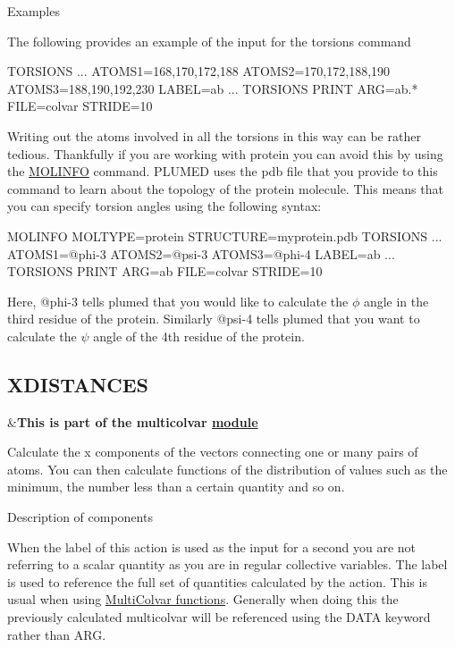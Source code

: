 \begin{DoxyParagraph}{Examples}

\end{DoxyParagraph}
The following provides an example of the input for the torsions command

\begin{DoxyVerb}TORSIONS ...
ATOMS1=168,170,172,188
ATOMS2=170,172,188,190
ATOMS3=188,190,192,230 
LABEL=ab
... TORSIONS
PRINT ARG=ab.* FILE=colvar STRIDE=10
\end{DoxyVerb}


Writing out the atoms involved in all the torsions in this way can be rather tedious. Thankfully if you are working with protein you can avoid this by using the \hyperlink{MOLINFO}{M\+O\+L\+I\+N\+F\+O} command. P\+L\+U\+M\+E\+D uses the pdb file that you provide to this command to learn about the topology of the protein molecule. This means that you can specify torsion angles using the following syntax\+:

\begin{DoxyVerb}MOLINFO MOLTYPE=protein STRUCTURE=myprotein.pdb
TORSIONS ...
ATOMS1=@phi-3
ATOMS2=@psi-3
ATOMS3=@phi-4
LABEL=ab
... TORSIONS 
PRINT ARG=ab FILE=colvar STRIDE=10
\end{DoxyVerb}


Here, @phi-\/3 tells plumed that you would like to calculate the $\phi$ angle in the third residue of the protein. Similarly @psi-\/4 tells plumed that you want to calculate the $\psi$ angle of the 4th residue of the protein. \hypertarget{XDISTANCES}{}\subsection{X\+D\+I\+S\+T\+A\+N\+C\+E\+S}\label{XDISTANCES}
\begin{TabularC}{2}
\hline
&{\bfseries  This is part of the multicolvar \hyperlink{mymodules}{module }}   \\
\end{TabularC}
Calculate the x components of the vectors connecting one or many pairs of atoms. You can then calculate functions of the distribution of values such as the minimum, the number less than a certain quantity and so on.

\begin{DoxyParagraph}{Description of components}

\end{DoxyParagraph}
When the label of this action is used as the input for a second you are not referring to a scalar quantity as you are in regular collective variables. The label is used to reference the full set of quantities calculated by the action. This is usual when using \hyperlink{mcolv_multicolvarfunction}{Multi\+Colvar functions}. Generally when doing this the previously calculated multicolvar will be referenced using the D\+A\+T\+A keyword rather than A\+R\+G.

